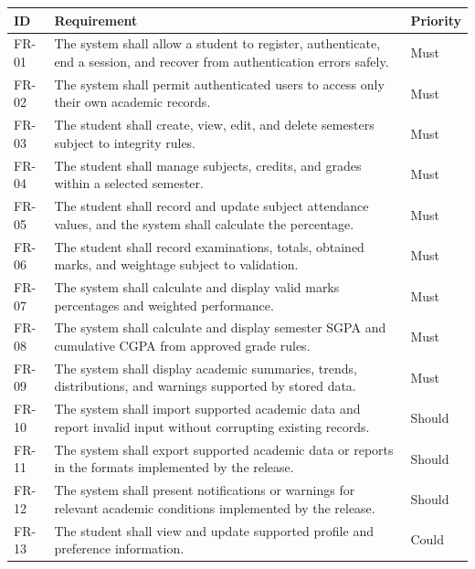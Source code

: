 \documentclass[
  10pt,
  a4paper,
  oneside]{report}
\newcounter{none} %
\begin{document}
{\def\LTcaptype{none} %
\begin{longtable}[]{@{}
  >{\raggedright\arraybackslash}p{}
  >{\raggedright\arraybackslash}p{}
  >{\raggedright\arraybackslash}p{}@{}}
\toprule\noalign{}
\begin{minipage}[b]{\linewidth}\raggedright
ID
\end{minipage} & \begin{minipage}[b]{\linewidth}\raggedright
Requirement
\end{minipage} & \begin{minipage}[b]{\linewidth}\raggedright
Priority
\end{minipage} \\
\midrule\noalign{}
\endhead
\bottomrule\noalign{}
\endlastfoot
FR-01 & The system shall allow a student to register, authenticate, end
a session, and recover from authentication errors safely. & Must \\
FR-02 & The system shall permit authenticated users to access only their
own academic records. & Must \\
FR-03 & The student shall create, view, edit, and delete semesters
subject to integrity rules. & Must \\
FR-04 & The student shall manage subjects, credits, and grades within a
selected semester. & Must \\
FR-05 & The student shall record and update subject attendance values,
and the system shall calculate the percentage. & Must \\
FR-06 & The student shall record examinations, totals, obtained marks,
and weightage subject to validation. & Must \\
FR-07 & The system shall calculate and display valid marks percentages
and weighted performance. & Must \\
FR-08 & The system shall calculate and display semester SGPA and
cumulative CGPA from approved grade rules. & Must \\
FR-09 & The system shall display academic summaries, trends,
distributions, and warnings supported by stored data. & Must \\
FR-10 & The system shall import supported academic data and report
invalid input without corrupting existing records. & Should \\
FR-11 & The system shall export supported academic data or reports in
the formats implemented by the release. & Should \\
FR-12 & The system shall present notifications or warnings for relevant
academic conditions implemented by the release. & Should \\
FR-13 & The student shall view and update supported profile and
preference information. & Could \\
\end{longtable}
}
\end{document}
